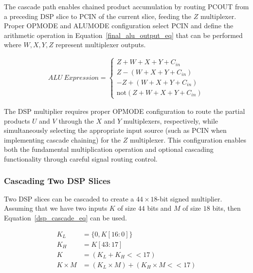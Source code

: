 \documentclass[conference]{IEEEtran}
\begin{document}
The cascade path enables chained product accumulation by routing PCOUT from a preceding DSP slice to PCIN of the current slice, feeding the $Z$ multiplexer. Proper OPMODE and ALUMODE configuration select PCIN and define the arithmetic operation in Equation~\ref{final_alu_output_eq} that can be performed where $W,X,Y,Z$ represent multiplexer outputs.

\begin{equation} \label{final_alu_output_eq}
\begin{split}
    \mathit{ALU\ Expression}=\begin{cases}
    Z +W+X+Y +C_{in}\\ 
                        Z -(W+X+Y +C_{in})\\ 
                        -Z +(W+X+Y +C_{in})\\ 
                        \text{not}(Z +W+X+Y +C_{in})            
    \end{cases}
\end{split}
\end{equation}

The DSP multiplier requires proper OPMODE configuration to route the partial products $U$ and $V$ through the $X$ and $Y$ multiplexers, respectively, while simultaneously selecting the appropriate input source (such as PCIN when implementing cascade chaining) for the $Z$ multiplexer. 
This configuration enables both the fundamental multiplication operation and optional cascading functionality through careful signal routing control.


\subsubsection{Cascading Two DSP Slices} \label{sec_dsp_cascade}
Two DSP slices can be cascaded to create a $44\times18$-bit signed multiplier. 
Assuming that we have two inputs $K$ of size $44$ bits and $M$ of size $18$ bits, then Equation~\ref{dsp_cascade_eq} can be used.

\begin{equation} \label{dsp_cascade_eq}
\begin{split}
    K_L &= \{0, K[16:0]\}\\         
    K_H &= {K[43:17]}\\ 
    K&= (K_L + K_H << 17)\\
    K\times M &= (K_L\times M) + (K_H \times M << 17)\\
\end{split}
\end{equation}
\end{document}
